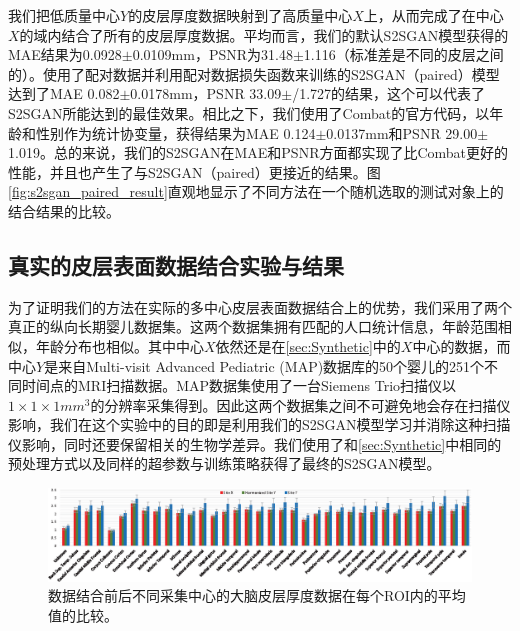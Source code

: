 我们把低质量中心$Y$的皮层厚度数据映射到了高质量中心$X$上，从而完成了在中心$X$的域内结合了所有的皮层厚度数据。平均而言，我们的默认S2SGAN模型获得的MAE结果为0.0928$\pm$0.0109mm，PSNR为31.48$\pm$1.116（标准差是不同的皮层之间的）。使用了配对数据并利用配对数据损失函数来训练的S2SGAN（paired）模型达到了MAE 0.082$\pm$0.0178mm，PSNR 33.09$\pm$/1.727的结果，这个可以代表了S2SGAN所能达到的最佳效果。相比之下，我们使用了Combat的官方代码，以年龄和性别作为统计协变量，获得结果为MAE 0.124$\pm$0.0137mm和PSNR 29.00$\pm$1.019。总的来说，我们的S2SGAN在MAE和PSNR方面都实现了比Combat更好的性能，并且也产生了与S2SGAN（paired）更接近的结果。图\ref{fig:s2sgan_paired_result}直观地显示了不同方法在一个随机选取的测试对象上的结合结果的比较。


\subsection{真实的皮层表面数据结合实验与结果}
为了证明我们的方法在实际的多中心皮层表面数据结合上的优势，我们采用了两个真正的纵向长期婴儿数据集。这两个数据集拥有匹配的人口统计信息，年龄范围相似，年龄分布也相似。其中中心$X$依然还是在\ref{sec:Synthetic}中的$X$中心的数据，而中心$Y$是来自Multi-visit Advanced Pediatric (MAP)数据库的50个婴儿的251个不同时间点的MRI扫描数据。MAP数据集使用了一台Siemens Trio扫描仪以$1\times 1\times 1mm^3$的分辨率采集得到。因此这两个数据集之间不可避免地会存在扫描仪影响，我们在这个实验中的目的即是利用我们的S2SGAN模型学习并消除这种扫描仪影响，同时还要保留相关的生物学差异。我们使用了和\ref{sec:Synthetic}中相同的预处理方式以及同样的超参数与训练策略获得了最终的S2SGAN模型。

\begin{figure}[t]
\centering
\includegraphics[width=\linewidth]{figure/s2sgan_roi_bar_realA_realB_fakeA.eps}
\caption{数据结合前后不同采集中心的大脑皮层厚度数据在每个ROI内的平均值的比较。}\label{fig:s2sgan_roi_bar_realA_realB_fakeA} 
\end{figure} 

